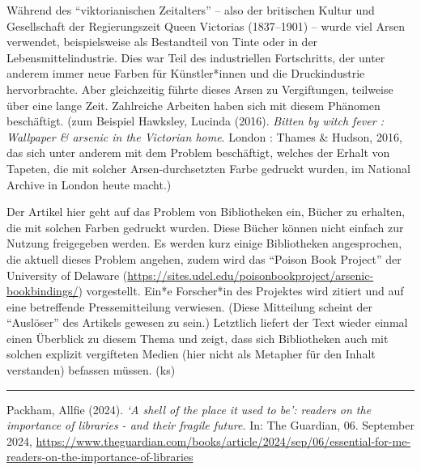 \documentclass[a4paper,
fontsize=11pt,
oneside,
numbers=noperiodatend,
parskip=half-,
bibliography=totoc,
final
]{scrartcl}
\begin{document}
Während des \enquote{viktorianischen Zeitalters} -- also der britischen
Kultur und Gesellschaft der Regierungszeit Queen Victorias (1837--1901)
-- wurde viel Arsen verwendet, beispielsweise als Bestandteil von Tinte
oder in der Lebensmittelindustrie. Dies war Teil des industriellen
Fortschritts, der unter anderem immer neue Farben für Künstler*innen und
die Druckindustrie hervorbrachte. Aber gleichzeitig führte dieses Arsen
zu Vergiftungen, teilweise über eine lange Zeit. Zahlreiche Arbeiten
haben sich mit diesem Phänomen beschäftigt. (zum Beispiel Hawksley,
Lucinda (2016). \emph{Bitten by witch fever : Wallpaper \& arsenic in
the Victorian home}. London : Thames \& Hudson, 2016, das sich unter
anderem mit dem Problem beschäftigt, welches der Erhalt von Tapeten, die
mit solcher Arsen-durchsetzten Farbe gedruckt wurden, im National
Archive in London heute macht.)

Der Artikel hier geht auf das Problem von Bibliotheken ein, Bücher zu
erhalten, die mit solchen Farben gedruckt wurden. Diese Bücher können
nicht einfach zur Nutzung freigegeben werden. Es werden kurz einige
Bibliotheken angesprochen, die aktuell dieses Problem angehen, zudem
wird das \enquote{Poison Book Project} der University of Delaware
(\url{https://sites.udel.edu/poisonbookproject/arsenic-bookbindings/})
vorgestellt. Ein*e Forscher*in des Projektes wird zitiert und auf eine
betreffende Pressemitteilung verwiesen. (Diese Mitteilung scheint der
\enquote{Auslöser} des Artikels gewesen zu sein.) Letztlich liefert der
Text wieder einmal einen Überblick zu diesem Thema und zeigt, dass sich
Bibliotheken auch mit solchen explizit vergifteten Medien (hier nicht
als Metapher für den Inhalt verstanden) befassen müssen. (ks)

\begin{center}\rule{0.5\linewidth}{0.5pt}\end{center}

Packham, Allfie (2024). \emph{\enquote*{A shell of the place it used to
be}: readers on the importance of libraries - and their fragile future.}
In: The Guardian, 06. September 2024,
\url{https://www.theguardian.com/books/article/2024/sep/06/essential-for-me-readers-on-the-importance-of-libraries}
\end{document}
